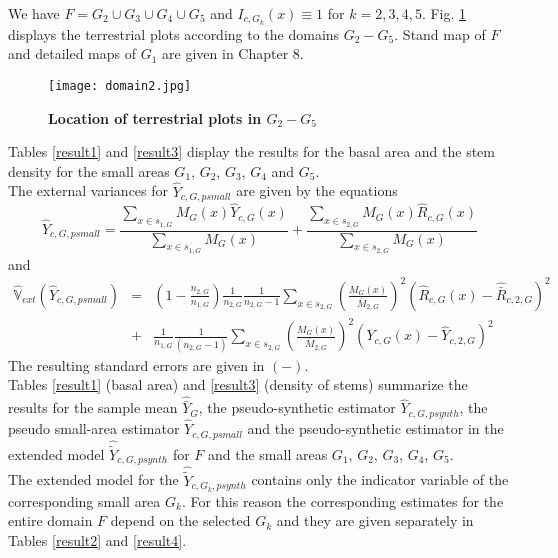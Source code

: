 \documentclass[a4paper,12pt,leqno, titlepage]{article}
\newcommand{\VAR}{\mathbb{V}}
\begin{document}
We have $F=G_2\cup G_3\cup G_4\cup G_5$ and $I_{c,G_k}(x) \equiv 1$ for $k=2,3,4,5$.
Fig. \ref{zbergterrestrial} displays the terrestrial plots according to the domains $G_2-G_5$. Stand map of $F$ and detailed maps of $G_1$ are given in \cite{mandallaz} Chapter 8.
\begin{figure}[h]
\begin{center}
\caption{\label{zbergterrestrial}\textbf{Location of terrestrial plots in $G_2-G_5$}}
\end{center}
\begin{center}
\texttt{[image: domain2.jpg]}
\end{center}
\end{figure}

Tables \ref{result1} and \ref{result3} display the results for the basal area and the stem density for the small areas $G_1$, $G_2$, $G_3$, $G_4$ and $G_5$.\\
The external variances for $\hat{Y}_{c,G,psmall}$ are given by the equations
\begin{equation*}
\hat{Y}_{c,G,psmall}=\frac{\sum_{x\in{s_{1,G}}}M_G(x)\hat{Y}_{c,G}(x)}{\sum_{x\in{s_{1,G}}}M_G(x)}
+\frac{\sum_{x\in{s_{2,G}}}M_G(x)\hat{R}_{c,G}(x)}{\sum_{x\in{s_{2,G}}}M_G(x)}
\end{equation*}
and
\begin{eqnarray*}
\widehat{\VAR}_{ext}(\widehat{Y}_{c,G,psmall})&=&\left(1-\frac{n_{2,G}}{n_{1,G}}\right)
\frac{1}{n_{2,G}}\frac{1}{n_{2,G}-1}
\sum_{x\in{s_{2,G}}}\left(\frac{M_G(x)}{\bar{M}_{2,G}}\right)^{2}(\hat{R}_{c,G}(x)-\hat{\bar{R}}_{c,2,G})^2\\
&+&
\frac{1}{n_{1,G}}\frac{1}{(n_{2,G}-1)}\sum_{x\in{s_{2,G}}}\left(\frac{M_G(x)}{\bar{M}_{2,G}}
\right)^{2}(Y_{c,G}(x)-\hat{Y}_{c,2,G})^2
\end{eqnarray*}
The resulting standard errors are given in $(-)$.\\
Tables \ref{result1} (basal area) and \ref{result3} (density of stems) summarize the results for the sample mean $\hat{\bar{Y}}_G$, the pseudo-synthetic estimator $\hat{Y}_{c,G,psynth}$, the pseudo small-area estimator $\hat{Y}_{c,G,psmall}$ and the pseudo-synthetic estimator in the extended model  $\hat{\tilde{Y}}_{c,G,psynth}$ for $F$ and the small areas $G_1$, $G_2$, $G_3$, $G_4$, $G_5$. \\
The extended model for the $\hat{\tilde{Y}}_{c,G_k,psynth}$ contains only the indicator variable of the corresponding small area $G_k$. For this reason the corresponding estimates for the entire domain $F$ depend on the selected $G_k$ and they are given separately in Tables \ref{result2} and \ref{result4}.\\
\end{document}
